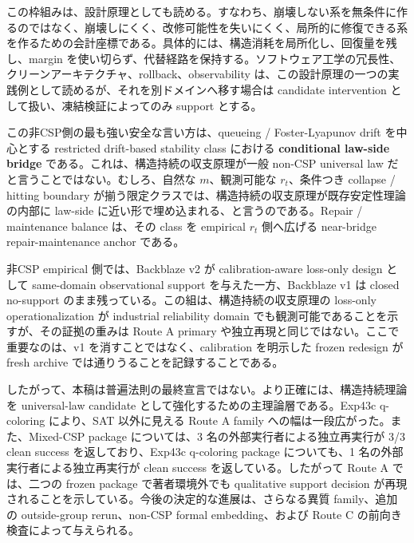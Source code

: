 \documentclass[12pt,a4paper]{article}
\begin{document}
この枠組みは、設計原理としても読める。すなわち、崩壊しない系を無条件に作るのではなく、崩壊しにくく、改修可能性を失いにくく、局所的に修復できる系を作るための会計座標である。具体的には、構造消耗を局所化し、回復量を残し、margin を使い切らず、代替経路を保持する。ソフトウェア工学の冗長性、クリーンアーキテクチャ、rollback、observability は、この設計原理の一つの実践例として読めるが、それを別ドメインへ移す場合は candidate intervention として扱い、凍結検証によってのみ support とする。

この非CSP側の最も強い安全な言い方は、queueing / Foster-Lyapunov drift を中心とする restricted drift-based stability class における \textbf{conditional law-side bridge} である。これは、構造持続の収支原理が一般 non-CSP universal law だと言うことではない。むしろ、自然な \(m\)、観測可能な \(r_{t}\)、条件つき collapse / hitting boundary が揃う限定クラスでは、構造持続の収支原理が既存安定性理論の内部に law-side に近い形で埋め込まれる、と言うのである。Repair / maintenance balance は、その class を empirical \(r_{t}\) 側へ広げる near-bridge repair-maintenance anchor である。

非CSP empirical 側では、Backblaze v2 が calibration-aware loss-only design として same-domain observational support を与えた一方、Backblaze v1 は closed no-support のまま残っている。この組は、構造持続の収支原理の loss-only operationalization が industrial reliability domain でも観測可能であることを示すが、その証拠の重みは Route A primary や独立再現と同じではない。ここで重要なのは、v1 を消すことではなく、calibration を明示した frozen redesign が fresh archive では通りうることを記録することである。

したがって、本稿は普遍法則の最終宣言ではない。より正確には、構造持続理論を universal-law candidate として強化するための主理論層である。Exp43c q-coloring により、SAT 以外に見える Route A family への幅は一段広がった。また、Mixed-CSP package については、3 名の外部実行者による独立再実行が 3/3 clean success を返しており、Exp43c q-coloring package についても、1 名の外部実行者による独立再実行が clean success を返している。したがって Route A では、二つの frozen package で著者環境外でも qualitative support decision が再現されることを示している。今後の決定的な進展は、さらなる異質 family、追加の outside-group rerun、non-CSP formal embedding、および Route C の前向き検査によって与えられる。
\end{document}
